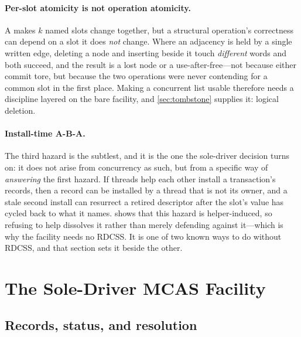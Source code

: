 \documentclass[11pt]{article}
\begin{document}
\paragraph{Per-slot atomicity is not operation atomicity.} A \kcas makes $k$
named slots change together, but a structural operation's correctness can depend
on a slot it does \emph{not} change. Where an adjacency is held by a single
written edge, deleting a node and inserting beside it touch \emph{different} words
and both succeed, and the result is a lost node or a use-after-free---not because
either commit tore, but because the two operations were never contending for a
common slot in the first place. Making a concurrent
list usable therefore needs a discipline layered on the bare facility, and
\cref{sec:tombstone} supplies it: logical deletion.

\paragraph{Install-time A-B-A.} The third hazard is the subtlest, and it is the
one the sole-driver decision turns on: it does not arise from concurrency as
such, but from a specific way of \emph{answering} the first hazard. If threads
help each other install a transaction's records, then a record can be installed
by a thread that is not its owner, and a stale second install can resurrect a
retired descriptor after the slot's value has cycled back to what it names.
 shows that this hazard is helper-induced, so refusing to help
dissolves it rather than merely defending against it---which is why the facility
needs no RDCSS. It is one of two known ways to do without RDCSS, and that
section sets it beside the other.

\section{The Sole-Driver MCAS Facility}
\label{sec:facility}

\subsection{Records, status, and resolution}
\label{sec:status}
\end{document}
